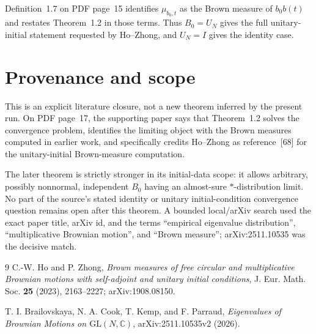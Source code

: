 \documentclass[11pt]{article}
\begin{document}
Definition~1.7 on PDF page~15 identifies $\mu_{b_0,t}$ as the Brown measure
of $b_0b(t)$ and restates Theorem~1.2 in those terms.  Thus $B_0=U_N$ gives
the full unitary-initial statement requested by Ho--Zhong, and $U_N=I$ gives
the identity case.

\section{Provenance and scope}

This is an explicit literature closure, not a new theorem inferred by the
present run.  On PDF page~17, the supporting paper says that Theorem~1.2
solves the convergence problem, identifies the limiting object with the
Brown measures computed in earlier work, and specifically credits
Ho--Zhong as reference~[68] for the unitary-initial Brown-measure computation.

The later theorem is strictly stronger in its initial-data scope: it allows
arbitrary, possibly nonnormal, independent $B_0$ having an almost-sure
$*$-distribution limit.  No part of the source's stated identity or unitary
initial-condition convergence question remains open after this theorem.
A bounded local/arXiv search used the exact paper title, arXiv id, and the
terms ``empirical eigenvalue distribution'', ``multiplicative Brownian
motion'', and ``Brown measure''; arXiv:2511.10535 was the decisive match.

\begin{thebibliography}{9}
C.-W. Ho and P. Zhong,
\emph{Brown measures of free circular and multiplicative Brownian motions
with self-adjoint and unitary initial conditions},
J. Eur. Math. Soc. \textbf{25} (2023), 2163--2227;
arXiv:1908.08150.

T. I. Brailovskaya, N. A. Cook, T. Kemp, and F. Parraud,
\emph{Eigenvalues of Brownian Motions on $\mathrm{GL}(N,\mathbb C)$},
arXiv:2511.10535v2 (2026).
\end{thebibliography}
\end{document}

